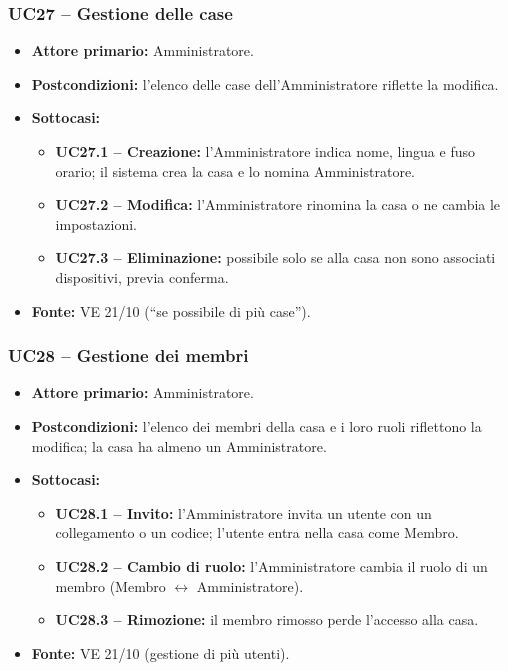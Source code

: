 \documentclass[12pt,a4paper]{article}
\newcommand{\tightlist}{\setlength{\itemsep}{1pt}\setlength{\parskip}{0pt}}
\begin{document}
\subsubsection{UC27 -- Gestione delle case}
\begin{itemize}
\tightlist
\item \textbf{Attore primario:} Amministratore.
\item \textbf{Postcondizioni:} l'elenco delle case dell'Amministratore riflette la modifica.
\item \textbf{Sottocasi:}
\begin{itemize}
\tightlist
\item \textbf{UC27.1 -- Creazione:} l'Amministratore indica nome, lingua e fuso orario; il sistema crea la casa e lo nomina Amministratore.
\item \textbf{UC27.2 -- Modifica:} l'Amministratore rinomina la casa o ne cambia le impostazioni.
\item \textbf{UC27.3 -- Eliminazione:} possibile solo se alla casa non sono associati dispositivi, previa conferma.
\end{itemize}
\item \textbf{Fonte:} VE 21/10 (``se possibile di più case'').
\end{itemize}

\subsubsection{UC28 -- Gestione dei membri}
\begin{itemize}
\tightlist
\item \textbf{Attore primario:} Amministratore.
\item \textbf{Postcondizioni:} l'elenco dei membri della casa e i loro ruoli riflettono la modifica; la casa ha almeno un Amministratore.
\item \textbf{Sottocasi:}
\begin{itemize}
\tightlist
\item \textbf{UC28.1 -- Invito:} l'Amministratore invita un utente con un collegamento o un codice; l'utente entra nella casa come Membro.
\item \textbf{UC28.2 -- Cambio di ruolo:} l'Amministratore cambia il ruolo di un membro (Membro $\leftrightarrow$ Amministratore).
\item \textbf{UC28.3 -- Rimozione:} il membro rimosso perde l'accesso alla casa.
\end{itemize}
\item \textbf{Fonte:} VE 21/10 (gestione di più utenti).
\end{itemize}
\end{document}
